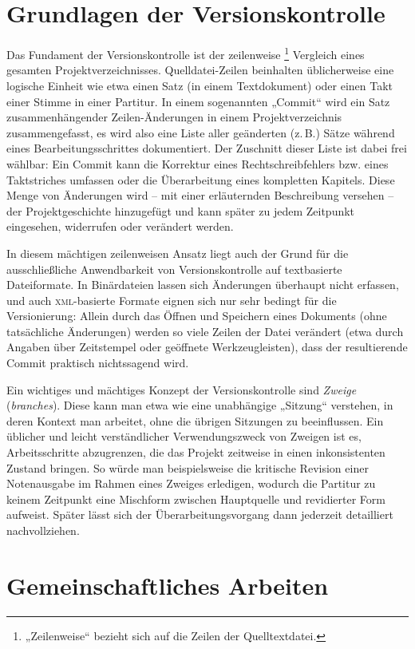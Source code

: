 \documentclass[DIV=12]{scrreprt}
\begin{document}
\section{Grundlagen der Versionskontrolle}
\label{sec:pt_basics-version-control}
Das Fundament der Versionskontrolle ist der zeilenweise%
\footnote{„Zeilenweise“ bezieht sich auf die Zeilen der Quelltextdatei.}
Vergleich eines gesamten Projektverzeichnisses.
Quelldatei-Zeilen beinhalten üblicherweise eine logische Einheit wie etwa einen Satz (in einem Textdokument) oder einen Takt einer Stimme in einer Partitur.
In einem sogenannten „Commit“ wird ein Satz zusammenhängender Zeilen-Änderungen in 
einem Projektverzeichnis zusammengefasst, es wird also eine Liste aller geänderten (z.\,B.) Sätze während eines Bearbeitungsschrittes dokumentiert.
Der Zuschnitt dieser Liste ist dabei frei wählbar:
Ein Commit kann die Korrektur eines Rechtschreibfehlers bzw. eines Taktstriches umfassen oder die Überarbeitung eines kompletten Kapitels.
Diese Menge von Änderungen wird -- mit einer erläuternden Beschreibung versehen -- der Projektgeschichte hinzugefügt und kann später zu jedem Zeitpunkt eingesehen, widerrufen oder verändert werden.

In diesem mächtigen zeilenweisen Ansatz liegt auch der Grund für die ausschließliche Anwendbarkeit von Versionskontrolle auf textbasierte Dateiformate.
In Binärdateien lassen sich Änderungen überhaupt nicht erfassen, und auch \textsc{xml}-basierte Formate eignen sich nur sehr bedingt für die Versionierung:
Allein durch das Öffnen und Speichern eines Dokuments (ohne tatsächliche Änderungen) werden so viele Zeilen der Datei verändert (etwa durch Angaben über Zeitstempel oder geöffnete Werkzeugleisten), dass der resultierende Commit praktisch nichtssagend wird.

Ein wichtiges und mächtiges Konzept der Versionskontrolle sind \emph{Zweige} (\emph{branches}).
Diese kann man etwa wie eine unabhängige „Sitzung“ verstehen, in deren Kontext man arbeitet, ohne die übrigen Sitzungen zu beeinflussen.
Ein üblicher und leicht verständlicher Verwendungszweck von Zweigen ist es, 
Arbeitsschritte abzugrenzen, die das Projekt zeitweise in einen inkonsistenten Zustand bringen.
So würde man beispielsweise die kritische Revision einer Notenausgabe im Rahmen eines Zweiges erledigen, wodurch die Partitur zu keinem Zeitpunkt eine Mischform zwischen Hauptquelle und revidierter Form aufweist.
Später lässt sich der Überarbeitungsvorgang dann jederzeit detailliert nachvollziehen.

\section{Gemeinschaftliches Arbeiten}
\label{sec:pt_collaborative-editing}
\end{document}
